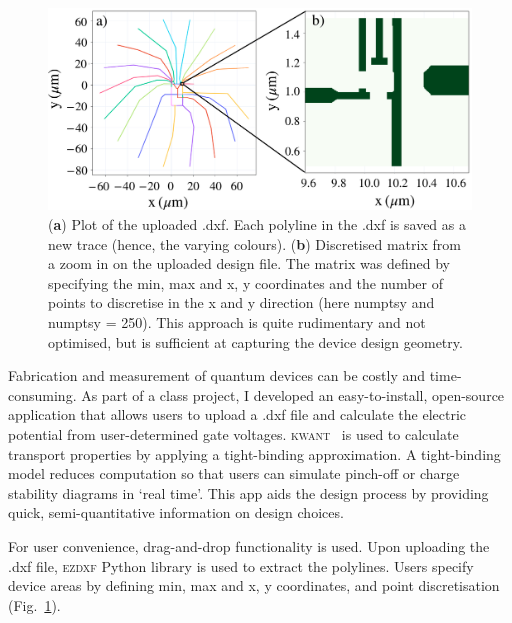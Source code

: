 \begin{figure}[!bht]
 \begin{center}
 \includegraphics[width=1.0\textwidth]{figures/appendix/appendix2_load.pdf}
 \caption[Loading a DXF Design File]{\label{fig:appx/kwant_load} 
 (\textbf{a}) Plot of the uploaded .dxf. Each polyline in the .dxf is saved as a new trace (hence, the varying colours). (\textbf{b}) Discretised matrix from a zoom in on the uploaded design file. The matrix was defined by specifying the min, max and x, y coordinates and the number of points to discretise in the x and y direction (here numptsy and numptsy = 250). This approach is quite rudimentary and not optimised, but is sufficient at capturing the device design geometry.}
 \end{center}
\end{figure}



Fabrication and measurement of quantum devices can be costly and time-consuming. As part of a class project, I developed an easy-to-install, open-source application that allows users to upload a .dxf file and calculate the electric potential from user-determined gate voltages.
\textsc{kwant}~\cite{kwant} is used to calculate transport properties by applying a tight-binding approximation. A tight-binding model reduces computation so that users can simulate pinch-off or charge stability diagrams in `real time'. This app aids the design process by providing quick, semi-quantitative information on design choices. 




For user convenience, drag-and-drop functionality is used. Upon uploading the .dxf file, \textsc{ezdxf} Python library is used to extract the polylines. Users specify device areas by defining min, max and x, y coordinates, and point discretisation (Fig.~\ref{fig:appx/kwant_load}). 


